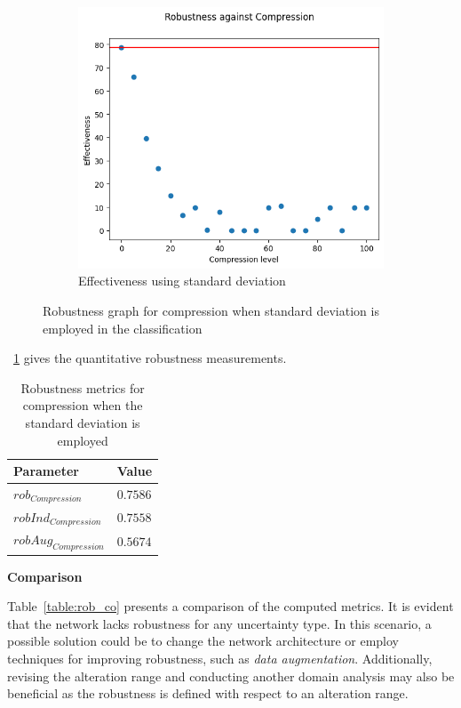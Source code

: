 \begin{figure}[H]
	\begin{subfigure}{.33\textwidth}
		\centering
		\includegraphics[width=0.9\linewidth]{ImageFiles/EvalBNN/CO/VU/eff}
		\caption{Effectiveness using standard deviation}
		\label{fig:co_vu_eff}
	\end{subfigure}
	\caption{Robustness graph for compression when standard deviation is employed in the classification}
	\label{fig:co_vu}
\end{figure}

\Tab~\ref{table:rob_co_vu} gives the quantitative robustness measurements.

\begin{table}[H]
	\centering
	\begin{tabular}{|| l | l ||} 
		\hline
		\textbf{Parameter} & \textbf{Value} \\
		\hline
		\hline
		$rob_{Compression}$ & $0.7586$ \\
		$robInd_{Compression}$ & $0.7558$ \\
		$robAug_{Compression}$ & $0.5674$ \\	
		\hline
	\end{tabular}	
	\caption{Robustness metrics for compression when the standard deviation is employed}
	\label{table:rob_co_vu}
\end{table}

\vspace{0.3cm}
\textbf{Comparison}
\vspace{0.1cm}

Table~\ref{table:rob_co} presents a comparison of the computed metrics. It is evident that the network lacks robustness for any uncertainty type. In this scenario, a possible solution could be to change the network architecture or employ techniques for improving robustness, such as \textit{data augmentation}. Additionally, revising the alteration range and conducting another domain analysis may also be beneficial as the robustness is defined with respect to an alteration range.

